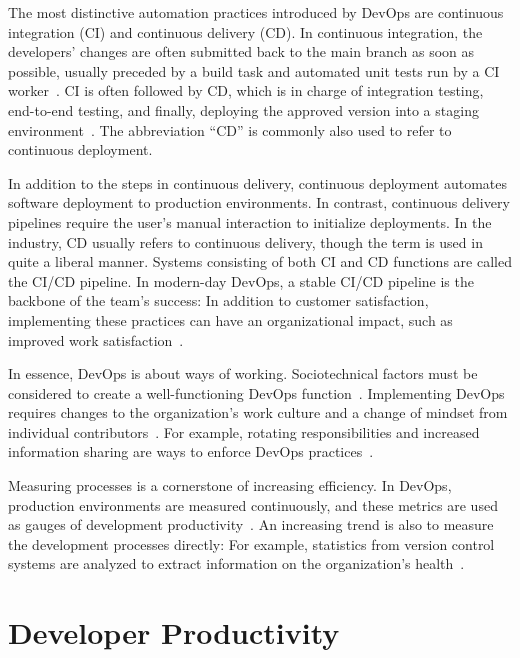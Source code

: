 The most distinctive automation practices introduced by DevOps are continuous integration (CI) and continuous delivery (CD). In continuous integration, the developers' changes are often submitted back to the main branch as soon as possible, usually preceded by a build task and automated unit tests run by a CI worker~\cite{sommerville_software_2016}. CI is often followed by CD, which is in charge of integration testing, end-to-end testing, and finally, deploying the approved version into a staging environment~\cite{chen_continuous_2015}. The abbreviation ``CD'' is commonly also used to refer to continuous deployment. 

In addition to the steps in continuous delivery, continuous deployment automates software deployment to production environments. In contrast, continuous delivery pipelines require the user's manual interaction to initialize deployments. In the industry, CD usually refers to continuous delivery, though the term is used in quite a liberal manner. Systems consisting of both CI and CD functions are called the CI/CD pipeline. In modern-day DevOps, a stable CI/CD pipeline is the backbone of the team's success: In addition to customer satisfaction, implementing these practices can have an organizational impact, such as improved work satisfaction~\cite{forsgren_accelerate_2018}. 
 
In essence, DevOps is about ways of working. Sociotechnical factors must be considered to create a well-functioning DevOps function~\cite{hemon-hildgen_agile_2020}. Implementing DevOps requires changes to the organization's work culture and a change of mindset from individual contributors~\cite{lassenius_agile_2015}. For example, rotating responsibilities and increased information sharing are ways to enforce DevOps practices~\cite{lassenius_agile_2015}.

Measuring processes is a cornerstone of increasing efficiency. In DevOps, production environments are measured continuously, and these metrics are used as gauges of development productivity~\cite{lassenius_agile_2015}. An increasing trend is also to measure the development processes directly: For example, statistics from version control systems are analyzed to extract information on the organization's health~\cite{forsgren_accelerate_2018}.

\section{Developer Productivity}

